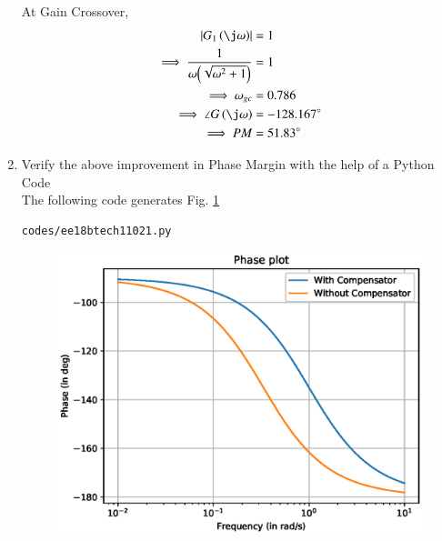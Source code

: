 \begin{enumerate}[label=\thesubsection.\arabic*.,ref=\thesubsection.\theenumi]
At Gain Crossover,
\begin{align}
\abs{G_{1}\brak{\j\omega}}&=1
\\
\implies \frac{1}{{\omega}{\brak{\sqrt{\omega^2+1}}}} &=1
\\
\implies \omega_{gc} &= 0.786
\\
\implies \angle G\brak{\j\omega} &= -128.167\degree
\\
\implies PM&=51.83\degree
\end{align}
%
\item Verify the above improvement in Phase Margin with the help of a Python Code
\\
\solution  The following code generates Fig. \ref{fig:ee18btech11021}

\begin{lstlisting}
codes/ee18btech11021.py
\end{lstlisting}

\begin{figure}[!ht]
\centering
\includegraphics[width=\columnwidth]{figs/ee18btech11021.eps}
\caption{}
\label{fig:ee18btech11021}
\end{figure}
\end{enumerate}
